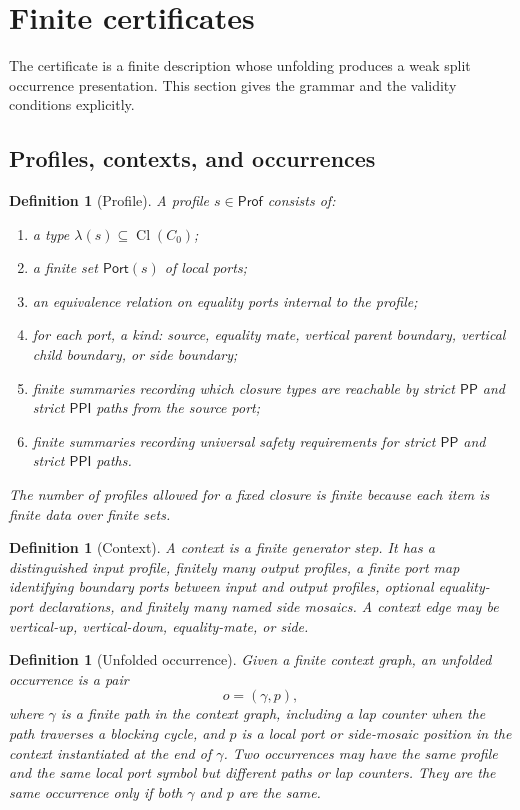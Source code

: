\documentclass[11pt]{article}
\newtheorem{definition}[theorem]{Definition}
\newcommand{\PP}{\mathsf{PP}}
\newcommand{\PPI}{\mathsf{PPI}}
\newcommand{\Cl}{\operatorname{Cl}}
\newcommand{\Prof}{\mathsf{Prof}}
\newcommand{\Port}{\mathsf{Port}}
\begin{document}
\section{Finite certificates}

The certificate is a finite description whose unfolding produces a weak split occurrence presentation.  This section gives the grammar and the validity conditions explicitly.

\subsection{Profiles, contexts, and occurrences}

\begin{definition}[Profile]\label{def:profile}
A profile $s\in\Prof$ consists of:
\begin{enumerate}[label=(P\arabic*)]
\item a type $\lambda(s)\subseteq\Cl(C_0)$;
\item a finite set $\Port(s)$ of local ports;
\item an equivalence relation on equality ports internal to the profile;
\item for each port, a kind: source, equality mate, vertical parent boundary, vertical child boundary, or side boundary;
\item finite summaries recording which closure types are reachable by strict $\PP$ and strict $\PPI$ paths from the source port;
\item finite summaries recording universal safety requirements for strict $\PP$ and strict $\PPI$ paths.
\end{enumerate}
The number of profiles allowed for a fixed closure is finite because each item is finite data over finite sets.
\end{definition}

\begin{definition}[Context]\label{def:context}
A context is a finite generator step.  It has a distinguished input profile, finitely many output profiles, a finite port map identifying boundary ports between input and output profiles, optional equality-port declarations, and finitely many named side mosaics.  A context edge may be vertical-up, vertical-down, equality-mate, or side.
\end{definition}

\begin{definition}[Unfolded occurrence]\label{def:unfolded-occ}
Given a finite context graph, an unfolded occurrence is a pair
\[
   o=(\gamma,p),
\]
where $\gamma$ is a finite path in the context graph, including a lap counter when the path traverses a blocking cycle, and $p$ is a local port or side-mosaic position in the context instantiated at the end of $\gamma$.  Two occurrences may have the same profile and the same local port symbol but different paths or lap counters.  They are the same occurrence only if both $\gamma$ and $p$ are the same.
\end{definition}
\end{document}
